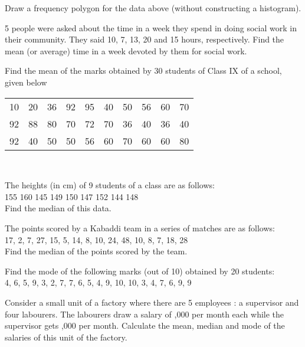 Draw a frequency polygon for the data above (without constructing a histogram).\\
\item 5 people were asked about the time in a week they spend in doing social work in their community. They said 10, 7, 13, 20 and 15 hours, respectively. Find the mean (or average) time in a week devoted by them for social work.\\
\item Find the mean of the marks obtained by 30 students of Class IX of a school, given below\\

\begin{tabular}{cccccccccc}
10 &20 &36 &92 &95 &40 &50 &56 &60 &70\\
92 &88 &80 &70 &72 &70 &36 &40 &36 &40\\
92 &40 &50 &50 &56 &60 &70 &60 &60 &80\\
\end{tabular}\\

\item The heights (in cm) of 9 students of a class are as follows:\\
155 160 145 149 150 147 152 144 148\\
Find the median of this data.\\
\item The points scored by a Kabaddi team in a series of matches are as follows:\\
17, 2, 7, 27, 15, 5, 14, 8, 10, 24, 48, 10, 8, 7, 18, 28 \\
Find the median of the points scored by the team.\\
\item Find the mode of the following marks (out of 10) obtained by 20 students:\\
4, 6, 5, 9, 3, 2, 7, 7, 6, 5, 4, 9, 10, 10, 3, 4, 7, 6, 9, 9\\
\item Consider a small unit of a factory where there are 5 employees : a supervisor and four labourers. The labourers draw a salary of ,000 per month each while the supervisor gets ,000 per month. Calculate the mean, median and mode
of the salaries of this unit of the factory.\\



